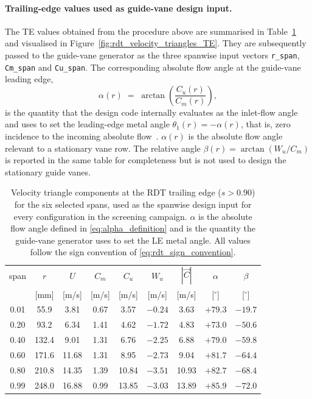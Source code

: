 \paragraph{Trailing-edge values used as guide-vane design input.}
The TE values obtained from the procedure above are summarised in Table~\ref{tab:rdt_te_values} and visualised in Figure~\ref{fig:rdt_velocity_triangles_TE}. They are subsequently passed to the guide-vane generator as the three spanwise input vectors \texttt{r\_span}, \texttt{Cm\_span} and \texttt{Cu\_span}. The corresponding absolute flow angle at the guide-vane leading edge,
\begin{equation}
\alpha(r) \;=\; \arctan\!\left(\frac{C_u(r)}{C_m(r)}\right),
\label{eq:alpha_definition}
\end{equation}
is the quantity that the design code internally evaluates as the inlet-flow angle and uses to set the leading-edge metal angle $\theta_1(r)=-\alpha(r)$, that is, zero incidence to the incoming absolute flow~\cite{Leonsen2025}. $\alpha(r)$ is the absolute flow angle relevant to a stationary vane row. The relative angle $\beta(r)=\arctan(W_u/C_m)$ is reported in the same table for completeness but is not used to design the stationary guide vanes.

\begin{table}[H]
  \centering
  \caption[RDT trailing-edge velocity triangle at six spans]{Velocity triangle components at the RDT trailing edge ($s>0.90$) for the six selected spans, used as the spanwise design input for every configuration in the screening campaign. $\alpha$ is the absolute flow angle defined in \eqref{eq:alpha_definition} and is the quantity the guide-vane generator uses to set the LE metal angle. All values follow the sign convention of \eqref{eq:rdt_sign_convention}.}
  \label{tab:rdt_te_values}
  \begin{tabular}{ccccccccc}
    \hline
    span & $r$ & $U$ & $C_m$ & $C_u$ & $W_u$ & $|\vec{C}|$ & $\alpha$ & $\beta$ \\
         & [mm] & [m/s] & [m/s] & [m/s] & [m/s] & [m/s] & [$^\circ$] & [$^\circ$] \\
    \hline
    0.01 &  55.9 &  3.81 & 0.67 &  3.57 & $-0.24$ &  3.63 & $+79.3$ & $-19.7$ \\
    0.20 &  93.2 &  6.34 & 1.41 &  4.62 & $-1.72$ &  4.83 & $+73.0$ & $-50.6$ \\
    0.40 & 132.4 &  9.01 & 1.31 &  6.76 & $-2.25$ &  6.88 & $+79.0$ & $-59.8$ \\
    0.60 & 171.6 & 11.68 & 1.31 &  8.95 & $-2.73$ &  9.04 & $+81.7$ & $-64.4$ \\
    0.80 & 210.8 & 14.35 & 1.39 & 10.84 & $-3.51$ & 10.93 & $+82.7$ & $-68.4$ \\
    0.99 & 248.0 & 16.88 & 0.99 & 13.85 & $-3.03$ & 13.89 & $+85.9$ & $-72.0$ \\
    \hline
  \end{tabular}
\end{table}
 
